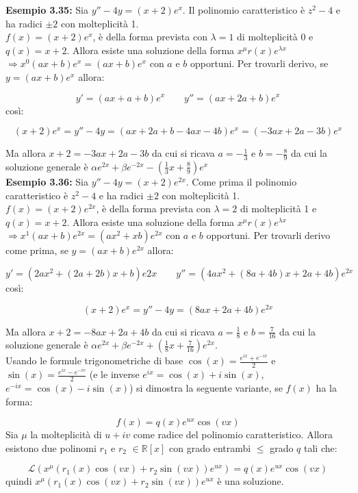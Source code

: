 \documentclass[a4paper,11pt,titlepage]{book}
\begin{document}
\textbf{Esempio 3.35:} Sia $y''-4y=(x+2)e^x$. Il polinomio caratteristico è $z^2-4$ e ha radici $\pm 2$ con molteplicità 1.\\

$f(x)=(x+2)e^x$, è della forma prevista con $\lambda=1$ di molteplicità 0 e $q(x)=x+2$. Allora esiste una soluzione della forma $x^\mu r(x)e^{\lambda x}$ $\Rightarrow x^0(ax+b)e^x=(ax+b)e^x$ con $a$ e $b$ opportuni. Per trovarli derivo, se $y=(ax+b)e^x$ allora:

$$y'=(ax+a+b)e^x\qquad y''=(ax+2a+b)e^x$$
così:

$$(x+2)e^x=y''-4y=(ax+2a+b-4ax-4b)e^x=(-3ax+2a-3b)e^x$$

Ma allora $x+2=-3ax+2a-3b$ da cui si ricava $a=-\frac{1}{3}$ e $b=-\frac{8}{9}$ da cui la soluzione generale è $\alpha e^{2x}+\beta e^{-2x}-(\frac{1}{3}x+\frac{8}{9})e^x$\\

\textbf{Esempio 3.36:} Sia $y''-4y=(x+2)e^{2x}$. Come prima il polinomio caratteristico è $z^2-4$ e ha radici $\pm 2$ con molteplicità 1.\\

$f(x)=(x+2)e^{2x}$, è della forma prevista con $\lambda=2$ di molteplicità 1 e $q(x)=x+2$. Allora esiste una soluzione della forma $x^\mu r(x)e^{\lambda x}$ $\Rightarrow x^1(ax+b)e^{2x}=(ax^2+xb)e^{2x}$ con $a$ e $b$ opportuni. Per trovarli derivo come prima, se $y=(ax+b)e^{2x}$ allora:

$$y'=(2ax^2+(2a+2b)x+b)e{2x}\qquad y''=(4ax^2+(8a+4b)x+2a+4b)e^{2x}$$
così:

$$(x+2)e^x=y''-4y=(8ax+2a+4b)e^{2x}$$

Ma allora $x+2=-8ax+2a+4b$ da cui si ricava $a=\frac{1}{8}$ e $b=\frac{7}{16}$ da cui la soluzione generale è $\alpha e^{2x}+\beta e^{-2x}+(\frac{1}{8}x+\frac{7}{16})e^{2x}$.\\

Usando le formule trigonometriche di base $\cos(x)=\frac{e^{ix}+e^{-iv}}{2}$ e $\sin(x)=\frac{e^{ix}-e^{-iv}}{2}$ (e le inverse $e^{ix}=\cos(x)+i\sin(x)$, $e^{-ix}=\cos(x)-i\sin(x)$) si dimostra la seguente variante, se $f(x)$ ha la forma:

$$f(x)=q(x)e^{ux}\cos(vx)$$
Sia $\mu$ la molteplicità di $u+iv$ come radice del polinomio caratteristico. Allora esistono due polinomi $r_1$ e $r_2$ $\in\mathbb{R}[x]$ con grado entrambi $\leq$ grado $q$ tali che:

$$\mathcal{L}(x^\mu(r_1(x)\cos(vx)+r_2\sin(vx))e^{ux})=q(x)e^{ux}\cos(vx)$$
quindi $x^\mu(r_1(x)\cos(vx)+r_2\sin(vx))e^{ux}$ è una soluzione.\\
\end{document}
